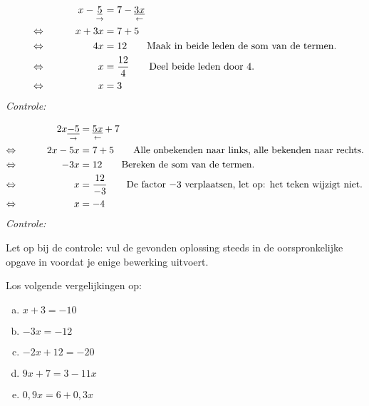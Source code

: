 \documentclass[12pt]{article}
\begin{document}
\newcommand{\underwrite}[2]{
\underset{#2}{\underline{#1}}
}

\begin{voorbeeld}
\begin{alignat*}{2}
     && x-\underwrite{5}{\rightarrow}  &= 7-\underwrite{3x}{\leftarrow}\\
\LRA && x + 3x &= 7 + 5 \\
\LRA && 4x &= 12 \qquad \text{Maak in beide leden de som van de termen.}\\
\LRA && x&=\dfrac{12}{4} \qquad\text{Deel beide leden door 4.}\\
\LRA && x&=3 \\
\end{alignat*}
{\em Controle: }\\
\end{voorbeeld}

\begin{voorbeeld}
\begin{alignat*}{2}
     && 2x\underwrite{-5}{\rightarrow}  &= \underwrite{5x}{\leftarrow}+7\\
\LRA && 2x-5x &= 7+5 \qquad\text{Alle onbekenden naar links, alle bekenden naar rechts.} \\
\LRA && -3x   &= 12 \qquad \text{Bereken de som van de termen.}\\
\LRA && x     &=\dfrac{12}{-3} \qquad\text{De factor $-3$ verplaatsen, let op: het teken wijzigt niet.}\\
\LRA && x     &= -4 \\
\end{alignat*}
{\em Controle: }\\
\end{voorbeeld}

Let op bij de controle: vul de gevonden oplossing steeds in de oorspronkelijke opgave in voordat je enige bewerking uitvoert.

\begin{exercise}
Los volgende vergelijkingen op:
\begin{enumerate}[(a)]
  \item $x+3=-10$
  \item $-3x=-12$
  \item $- 2x + 12 = - 20$
  \item $9x + 7 = 3 - 11x$
  \item $0,9x = 6 + 0,3x$
\end{enumerate}
\end{exercise}
\end{document}
